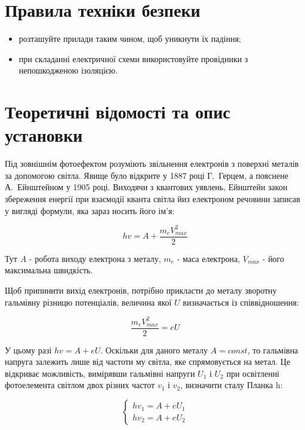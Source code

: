 \documentclass[twocolumn]{el-author}
\begin{document}
\section{Правила техніки безпеки}

\begin{itemize}
	\item  розташуйте прилади таким чином, щоб уникнути їх падіння;
	\item  при складанні електричної схеми використовуйте провідники з непошкодженою ізоляцією.
\end{itemize}

\section{Теоретичні відомості та опис установки}

Під зовнішнім фотоефектом розуміють звільнення електронів з поверхні металів за допомогою світла. Явище було відкрите у 1887 році Г.~Герцем, а пояснене А.~Ейнштейном у 1905 році. Виходячи з квантових уявлень, Ейнштейн закон збереження енергії при взаємодії кванта світла йиз електроном речовини записав у вигляді формули, яка зараз носить його ім'я:

\begin{equation} \label{eq:Einstein}
hv = A+\frac{m_{e}V_{max}^{2}}{2}
\end{equation}

Тут $A$ - робота виходу електрона з металу, $m_{e}$ - маса електрона, $V_{max}$ - його максимальна швидкість.

Щоб припинити вихід електронів, потрібно прикласти до металу зворотну гальмівну різницю потенціалів, величина якої $U$ визначається із співвідношення:

\begin{equation} \label{eq:Einstein_reverse}
\frac{m_{e}V_{max}^{2}}{2} = eU
\end{equation}

У цьому разі $hv = A + eU$. Оскільки для даного металу $A = const$, то гальмівна напруга залежить лише від частоти му світла, яке спрямовується на метал. Це відкриває можливість, вимірявши гальмівні напруги $U_{1}$ і $U_{2}$ при освітленні фотоелемента світлом двох різних частот $v_{1}$ і $v_{2}$, визначити сталу Планка h:

\begin{equation} \label{eq:1}
\left\{\begin{matrix}
hv_{1} = A+eU_{1}
\\ hv_{2} = A+eU_{2}
\end{matrix}\right.
\end{equation}
\end{document}
